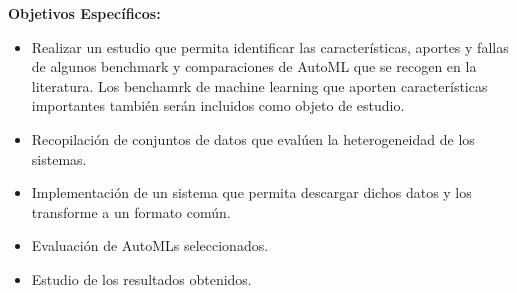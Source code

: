 \begin{flushleft} 
\textbf{Objetivos Específicos:}
\begin{itemize}
    \item Realizar un estudio que permita identificar las características, aportes y fallas de algunos benchmark y comparaciones de AutoML que se recogen en la 
    literatura. 
    Los benchamrk de machine learning que aporten características importantes también serán incluidos como objeto de estudio.
    \item Recopilación de conjuntos de datos que evalúen la heterogeneidad de los sistemas.
    \item Implementación de un sistema que permita descargar dichos datos y los transforme a un formato común.  
    \item Evaluación de AutoMLs seleccionados.
    \item Estudio de los resultados obtenidos.
\end{itemize}
\end{flushleft}
    
